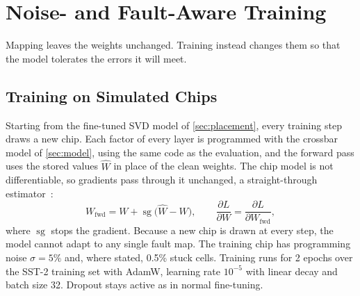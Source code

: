 \section{Noise- and Fault-Aware Training}\label{sec:training}

Mapping leaves the weights unchanged. Training instead changes them so that the model tolerates the
errors it will meet.

\subsection{Training on Simulated Chips}
Starting from the fine-tuned SVD model of \cref{sec:placement}, every training step draws a new chip.
Each factor of every layer is programmed with the crossbar model of \cref{sec:model}, using the same code
as the evaluation, and the forward pass uses the stored values $\hat W$ in place of the clean weights.
The chip model is not differentiable, so gradients pass through it unchanged, a straight-through
estimator~\cite{bengio2013ste}:
\begin{equation}
W_{\text{fwd}}=W+\operatorname{sg}\big(\hat W-W\big),\qquad
\frac{\partial L}{\partial W}=\frac{\partial L}{\partial W_{\text{fwd}}},
\label{eq:ste}
\end{equation}
where $\operatorname{sg}$ stops the gradient. Because a new chip is drawn at every step, the model cannot
adapt to any single fault map. The training chip has programming noise $\sigma=5\%$ and, where stated,
0.5\% stuck cells. Training runs for 2 epochs over the SST-2 training set with AdamW, learning rate
$10^{-5}$ with linear decay and batch size 32. Dropout stays active as in normal fine-tuning.

